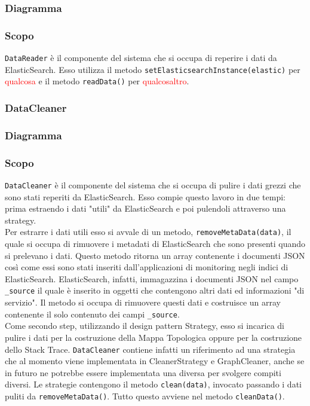 	\subsubsection{Diagramma}
	
	\subsubsection{Scopo}
	\texttt{DataReader} è il componente del sistema che si occupa di reperire i dati da ElasticSearch. Esso utilizza il metodo \texttt{setElasticsearchInstance(elastic)} per \textcolor{red}{qualcosa} e il metodo \texttt{readData()} per \textcolor{red}{qualcosaltro}.



\subsubsection{DataCleaner}
\label{sec:DataCleaner}
	\subsubsection{Diagramma}
	
	\subsubsection{Scopo}
	\texttt{DataCleaner} è il componente del sistema che si occupa di pulire i dati grezzi che sono stati reperiti da ElasticSearch. Esso compie questo lavoro in due tempi: prima estraendo i dati "utili" da ElasticSearch e poi pulendoli attraverso una strategy.\\
	Per estrarre i dati utili esso si avvale di un metodo, \texttt{removeMetaData(data)}, il quale si occupa di rimuovere i metadati di ElasticSearch che sono presenti quando si prelevano i dati. Questo metodo ritorna un array contenente i documenti JSON così come essi sono stati inseriti dall'applicazioni di monitoring negli indici di ElasticSearch. ElasticSearch, infatti, immagazzina i documenti JSON nel campo \texttt{\_source} il quale è inserito in oggetti che contengono altri dati ed informazioni "di servizio". Il metodo si occupa di rimuovere questi dati e costruisce un array contenente il solo contenuto dei campi \texttt{\_source}.\\
	Come secondo step, utilizzando il design pattern Strategy, esso si incarica di pulire i dati per la costruzione della Mappa Topologica oppure per la costruzione dello Stack Trace. \texttt{DataCleaner} contiene infatti un riferimento ad una strategia che al momento viene implementata in CleanerStrategy e GraphCleaner, anche se in futuro ne potrebbe essere implementata una diversa per svolgere compiti diversi. Le strategie contengono il metodo \texttt{clean(data)}, invocato passando i dati puliti da \texttt{removeMetaData()}. Tutto questo avviene nel metodo \texttt{cleanData()}.
	
